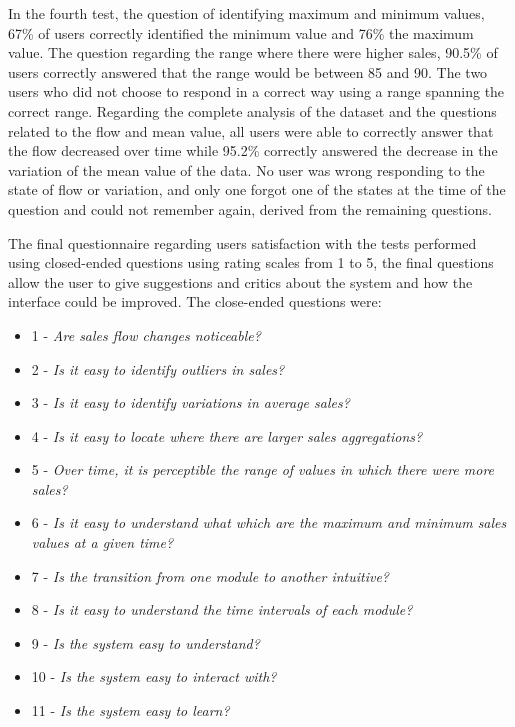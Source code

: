 \documentclass[letterpaper, 10 pt, conference]{ieeeconf}  %
\begin{document}
In the fourth test, the question of identifying maximum and minimum values, 67\% of users correctly identified the minimum value and 76\% the maximum value.
The question regarding the range where there were higher sales, 90.5\% of users correctly answered that the range would be between 85 and 90. The two users who did not choose to respond in a correct way using a range spanning the correct range. \newline
Regarding the complete analysis of the dataset and the questions related to the flow and mean value, all users were able to correctly answer that the flow decreased over time while 95.2\% correctly answered the decrease in the variation of the mean value of the data. \newline
No user was wrong responding to the state of flow or variation, and only one forgot one of the states at the time of the question and could not remember again, derived from the remaining questions.


The final questionnaire regarding users satisfaction with the tests performed using closed-ended questions using rating scales from 1 to 5, the final questions allow the user to give suggestions and critics about the system and how the interface could be improved.
The close-ended questions were:
\begin{itemize}
    \item 1 - \textit{Are sales flow changes noticeable?}
    \item 2 - \textit{Is it easy to identify outliers in sales?}
    \item 3 - \textit{Is it easy to identify variations in average sales?}
    \item 4 - \textit{Is it easy to locate where there are larger sales aggregations?}
    \item 5 - \textit{Over time, it is perceptible the range of values in which there were more sales?}
    \item 6 - \textit{Is it easy to understand what which are the maximum and minimum sales values at a given time?}
    \item 7 - \textit{Is the transition from one module to another intuitive? }
    \item 8 - \textit{Is it easy to understand the time intervals of each module? } 
    \item 9 - \textit{Is the system easy to understand? }
    \item 10 - \textit{Is the system easy to interact with? }
    \item 11 - \textit{Is the system easy to learn? }
\end{itemize}
\end{document}
